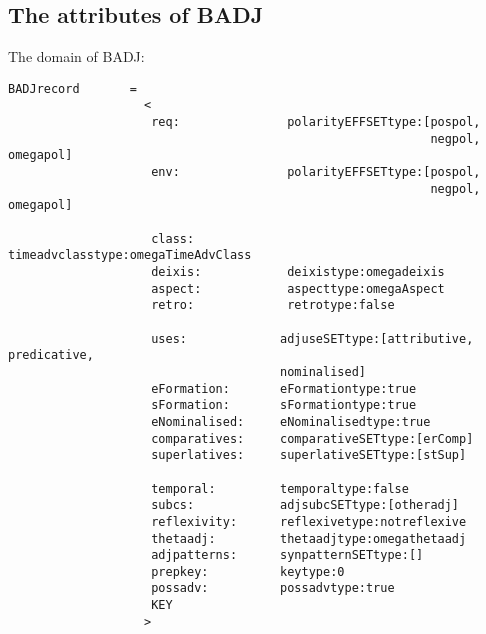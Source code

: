 \subsection{The attributes of BADJ}

The domain of BADJ:

\begin{verbatim}
BADJrecord       =
                   <
                    req:               polarityEFFSETtype:[pospol, 
                                                           negpol, omegapol]
                    env:               polarityEFFSETtype:[pospol, 
                                                           negpol, omegapol]

                    class:             timeadvclasstype:omegaTimeAdvClass
                    deixis:            deixistype:omegadeixis
                    aspect:            aspecttype:omegaAspect
                    retro:             retrotype:false

                    uses:             adjuseSETtype:[attributive, predicative,
                                      nominalised] 
                    eFormation:       eFormationtype:true  
                    sFormation:       sFormationtype:true 
                    eNominalised:     eNominalisedtype:true  
                    comparatives:     comparativeSETtype:[erComp]  
                    superlatives:     superlativeSETtype:[stSup]  

                    temporal:         temporaltype:false
                    subcs:            adjsubcSETtype:[otheradj]
                    reflexivity:      reflexivetype:notreflexive
                    thetaadj:         thetaadjtype:omegathetaadj
                    adjpatterns:      synpatternSETtype:[]
                    prepkey:          keytype:0
                    possadv:          possadvtype:true
                    KEY
                   >
\end{verbatim}

